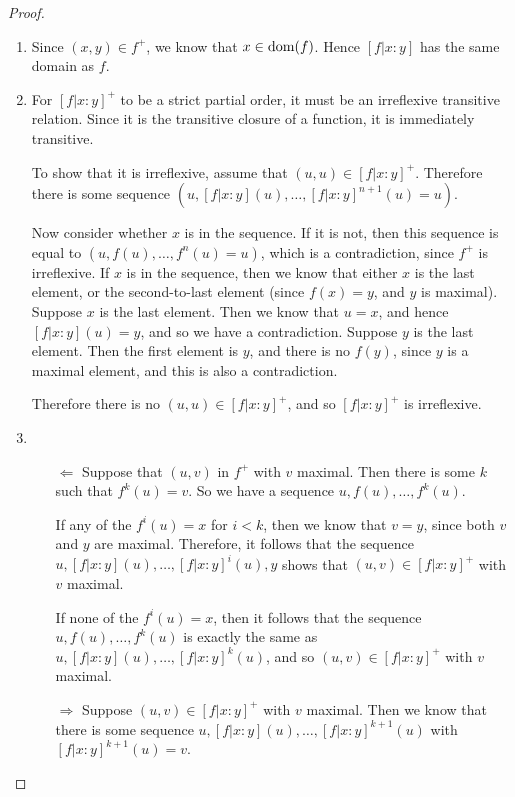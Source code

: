 \begin{proof}
\begin{enumerate}
\item 
Since $(x,y) \in f^+$, we know that $x \in \mbox{dom}({f})$. Hence $[f|x:y]$
has the same domain as $f$. 

\item 
For $[f|x:y]^+$ to be a strict partial order, it must be an
irreflexive transitive relation.  Since it is the transitive closure
of a function, it is immediately transitive. 

To show that it is irreflexive, assume that $(u, u) \in
[f|x:y]^+$. Therefore there is some sequence $(u, [f|x:y](u), \ldots,
[f|x:y]^{n+1}(u) = u)$.

Now consider whether $x$ is in the sequence. If it is not, then this
sequence is equal to $(u, f(u), \ldots, f^n(u) = u)$, which is a
contradiction, since $f^+$ is irreflexive. If $x$ is in the sequence,
then we know that either $x$ is the last element, or the
second-to-last element (since $f(x) = y$, and $y$ is maximal).
Suppose $x$ is the last element. Then we know that $u = x$, and hence
$[f|x:y](u) = y$, and so we have a contradiction. Suppose $y$ is the
last element. Then the first element is $y$, and there is no $f(y)$,
since $y$ is a maximal element, and this is also a
contradiction. 

Therefore there is no $(u, u) \in [f|x:y]^+$, and so $[f|x:y]^+$ is
irreflexive.

\item
\begin{itemize}
\item[$\Leftarrow$] Suppose that $(u, v)$ in $f^{+}$ with $v$
  maximal. Then there is some $k$ such that $f^k(u) = v$. So we have a
  sequence $u, f(u), \ldots, f^k(u)$.

If any of the $f^i(u) = x$ for $i < k$, then we know that $v = y$,
since both $v$ and $y$ are maximal. Therefore, it follows that the
sequence $u, [f|x:y](u), \ldots, [f|x:y]^i(u), y$ shows that $(u,v)
\in [f|x:y]^+$ with $v$ maximal.

If none of the $f^i(u) = x$, then it follows that the sequence $u,
f(u), \ldots, f^k(u)$ is exactly the same as $u, [f|x:y](u), \ldots,
[f|x:y]^k(u)$, and so $(u, v) \in [f|x:y]^+$ with $v$ maximal.

\item[$\Rightarrow$] Suppose $(u,v) \in [f|x:y]^{+}$ with $v$
  maximal. Then we know that there is some sequence $u, [f|x:y](u),
  \ldots, [f|x:y]^{k+1}(u)$ with $[f|x:y]^{k+1}(u) = v$.


\end{itemize}
\end{enumerate}
\end{proof}
